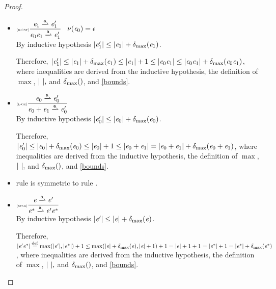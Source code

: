\begin{proof}
\begin{description}
\begin{itemize}
    \item $\Rule{r-cat}{\re_1\parDer{\sym}\re'_1}{\re_0\catop\re_1\parDer{\sym}\re'_1}{\hasEps{\re_0}=\eps}$\\[2ex]
          By inductive hypothesis ${\mid}{\mathit {e}_1'}{\mid}\leq {\mid}{\ensuremath{\mathit {e}}_1}{\mid}+{\delta_{\max}}({\mathit {e}_1})$.

          Therefore, ${\mid}{\mathit {e}_1'}{\mid}\leq {\mid}{\ensuremath{\mathit {e}}_1}{\mid}+{\delta_{\max}}({\mathit {e}_1})\leq{\mid}{\ensuremath{\mathit {e}}_1}{\mid}+1\leq{\mid}{\ensuremath{\mathit {e}}_0\ensuremath{\mathit {e}}_1}{\mid}\leq{\mid}{\ensuremath{\mathit {e}}_0\ensuremath{\mathit {e}}_1}{\mid}+{\delta_{\max}}({\mathit {e}_0\mathit {e}_1})$, where inequalities are derived from the inductive hypothesis, the definition of $\max$, ${\mid}{\ }{\mid},$ and ${\delta_{\max}}({})$, and \cref{bounds}.

    \item $\Rule{l-or}{\re_0\parDer{\sym}\re'_0}{\re_0\orop\re_1\parDer{\sym}\re'_0}{}$\\[2ex]
          By inductive hypothesis ${\mid}{\mathit {e}_0'}{\mid}\leq {\mid}{\ensuremath{\mathit {e}}_0}{\mid}+{\delta_{\max}}({\mathit {e}_0})$.

          Therefore, ${\mid}{\mathit {e}_0'}{\mid}\leq {\mid}{\ensuremath{\mathit {e}}_0}{\mid}+{\delta_{\max}}({\mathit {e}_0})\leq{\mid}{\ensuremath{\mathit {e}}_0}{\mid}+1\leq{\mid}{\ensuremath{\mathit {e}}_0\mathbin{+}\ensuremath{\mathit {e}}_1}{\mid}={\mid}{\mathit {e}_0\mathbin{+}\mathit {e}_1}{\mid}+{\delta_{\max}}({\mathit {e}_0\mathbin{+}\mathit {e}_1})$, where inequalities are derived from the inductive hypothesis, the definition of $\max$, ${\mid}{\ }{\mid},$ and ${\delta_{\max}}({})$, and \cref{bounds}.
    \item rule  is symmetric to  rule .
    \item $\Rule{star}{\re\parDer{\sym}\re'}{\starop{\re}\parDer{\sym}\re'\starop{\re}}{}$\\[2ex]
          By inductive hypothesis ${\mid}{\mathit {e}'}{\mid}\leq {\mid}{\ensuremath{\mathit {e}}}{\mid}+{\delta_{\max}}({\mathit {e}})$.

          Therefore, ${\mid}{\mathit {e}'{\mathit {e}}^*}{\mid}\stackrel{\mathrm{def}}{=}\max({\mid}{\mathit {e}'}{\mid},{{\mid}{{\mathit {e}}^*}{\mid}})+1\leq \max({\mid}{\mathit {e}}{\mid}+{\delta_{\max}}({\mathit {e}}),{{\mid}{\mathit {e}}{\mid}}+1)+1={\mid}{\mathit {e}}{\mid}+1+1={\mid}{{\mathit {e}}^*}{\mid}+1={\mid}{{\mathit {e}}^*}{\mid}+{\delta_{\max}}({{\mathit {e}}^*})$, where inequalities are derived from the inductive hypothesis, the definition of $\max$, ${\mid}{\ }{\mid},$ and ${\delta_{\max}}({})$, and \cref{bounds}.
   \end{itemize}
 \end{description}
\end{proof}


